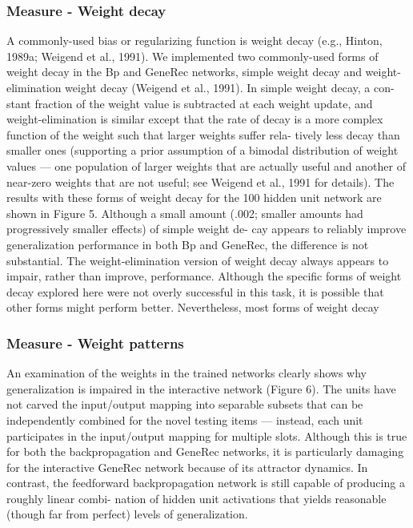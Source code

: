 \subsubsection{Measure - Weight decay}
A commonly-used bias or regularizing function is weight decay (e.g., Hinton, 1989a; Weigend et al., 1991).
We implemented two commonly-used forms of weight decay in the Bp and GeneRec networks, simple
weight decay and weight-elimination weight decay (Weigend et al., 1991). In simple weight decay, a con-
stant fraction of the weight value is subtracted at each weight update, and weight-elimination is similar
except that the rate of decay is a more complex function of the weight such that larger weights suffer rela-
tively less decay than smaller ones (supporting a prior assumption of a bimodal distribution of weight values
— one population of larger weights that are actually useful and another of near-zero weights that are not
useful; see Weigend et al., 1991 for details).
The results with these forms of weight decay for the 100 hidden unit network are shown in Figure 5.
Although a small amount (.002; smaller amounts had progressively smaller effects) of simple weight de-
cay appears to reliably improve generalization performance in both Bp and GeneRec, the difference is not
substantial. The weight-elimination version of weight decay always appears to impair, rather than improve,
performance. Although the specific forms of weight decay explored here were not overly successful in
this task, it is possible that other forms might perform better. Nevertheless, most forms of weight decay
\citet{o2001generalization} 

\subsubsection{Measure - Weight patterns} 
An examination of the weights in the trained networks clearly shows why generalization is impaired in the
interactive network (Figure 6). The units have not carved the input/output mapping into separable subsets
that can be independently combined for the novel testing items — instead, each unit participates in the
input/output mapping for multiple slots. Although this is true for both the backpropagation and GeneRec
networks, it is particularly damaging for the interactive GeneRec network because of its attractor dynamics.
In contrast, the feedforward backpropagation network is still capable of producing a roughly linear combi-
nation of hidden unit activations that yields reasonable (though far from perfect) levels of generalization. \citet{o2001generalization} 

